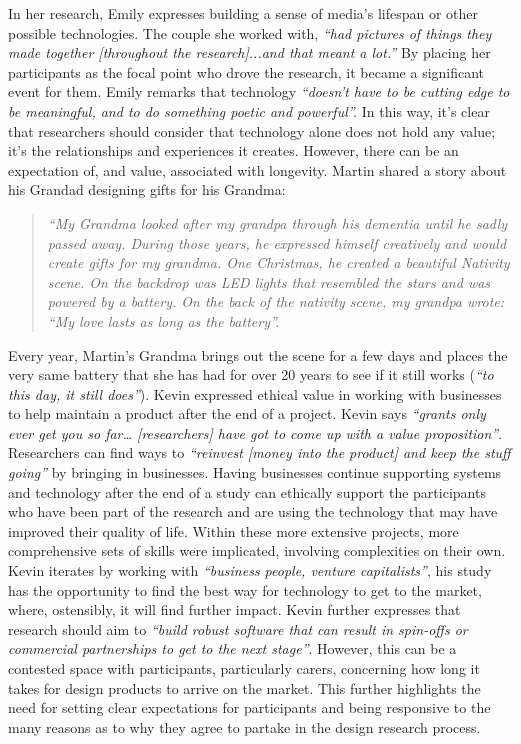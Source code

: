 In her research, Emily expresses building a sense of media’s lifespan or other possible technologies. The couple she worked with, \textit{“had pictures of things they made together [throughout the research]...and that meant a lot.”} By placing her participants as the focal point who drove the research, it became a significant event for them. Emily remarks that technology \textit{“doesn’t have to be cutting edge to be meaningful, and to do something poetic and powerful”.} In this way, it’s clear that researchers should consider that technology alone does not hold any value; it’s the relationships and experiences it creates. However, there can be an expectation of, and value, associated with longevity. Martin shared a story about his Grandad designing gifts for his Grandma:
\begin{quote}
\textit{“My Grandma looked after my grandpa through his dementia until he sadly passed away. During those years, he expressed himself creatively and would create gifts for my grandma. One Christmas, he created a beautiful Nativity scene. On the backdrop was LED lights that resembled the stars and was powered by a battery. On the back of the nativity scene, my grandpa wrote: “My love lasts as long as the battery”.}
\end{quote}

Every year, Martin’s Grandma brings out the scene for a few days and places the very same battery that she has had for over 20 years to see if it still works (\textit{“to this day, it still does”}). Kevin expressed ethical value in working with businesses to help maintain a product after the end of a project. Kevin says \textit{“grants only ever get you so far… [researchers] have got to come up with a value proposition”}. Researchers can find ways to \textit{“reinvest [money into the product] and keep the stuff going”} by bringing in businesses. Having businesses continue supporting systems and technology after the end of a study can ethically support the participants who have been part of the research and are using the technology that may have improved their quality of life. Within these more extensive projects, more comprehensive sets of skills were implicated, involving complexities on their own. Kevin iterates by working with \textit{“business people, venture capitalists”}, his study has the opportunity to find the best way for technology to get to the market, where, ostensibly, it will find further impact. Kevin further expresses that research should aim to \textit{“build robust software that can result in spin-offs or commercial partnerships to get to the next stage”}. However, this can be a contested space with participants, particularly carers, concerning how long it takes for design products to arrive on the market. This further highlights the need for setting clear expectations for participants and being responsive to the many reasons as to why they agree to partake in the design research process. 

